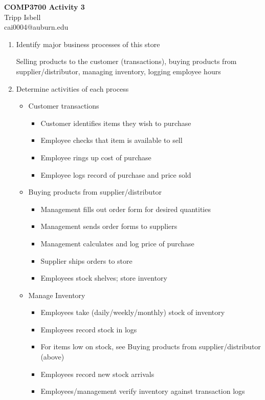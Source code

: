 \documentclass{letter}
\begin{document}
\begin{center}
\textbf{COMP3700 Activity 3}\\
Tripp Isbell\\
cai0004@auburn.edu
\end{center}

\begin{enumerate}
	\item Identify major business processes of this store
	
	Selling products to the customer (transactions), buying products from supplier/distributor, managing inventory, logging employee hours
	
	\item Determine activities of each process
	
	\begin{itemize}
		\item Customer transactions
		\begin{itemize} 
			\item Customer identifies items they wish to purchase
			\item Employee checks that item is available to sell
			\item Employee rings up cost of purchase
			\item Employee logs record of purchase and price sold
		\end{itemize}
		\item Buying products from supplier/distributor
		\begin{itemize}
			\item Management fills out order form for desired quantities
			\item Management sends order forms to suppliers
			\item Management calculates and log price of purchase
			\item Supplier ships orders to store
			\item Employees stock shelves; store inventory
		\end{itemize}
		\item Manage Inventory
		\begin{itemize}
			\item Employees take (daily/weekly/monthly) stock of inventory
			\item Employees record stock in logs
			\item For items low on stock, see Buying products from supplier/distributor (above)
			\item Employees record new stock arrivals
			\item Employees/management verify inventory against transaction logs

\end{itemize}
\end{itemize}
\end{enumerate}
\end{document}
